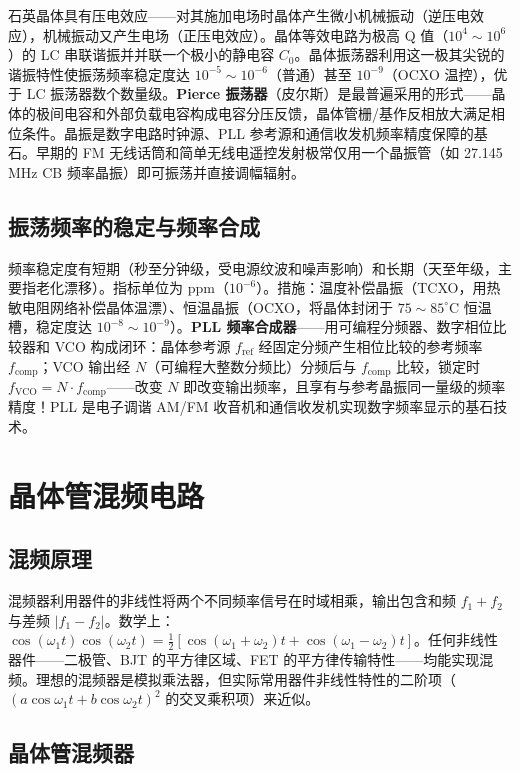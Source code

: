 \documentclass[12pt,UTF8]{ctexbook}
\begin{document}
石英晶体具有压电效应——对其施加电场时晶体产生微小机械振动（逆压电效应），机械振动又产生电场（正压电效应）。晶体等效电路为极高 Q 值（$10^4\sim10^6$）的 LC 串联谐振并并联一个极小的静电容 $C_0$。晶体振荡器利用这一极其尖锐的谐振特性使振荡频率稳定度达 $10^{-5}\sim10^{-6}$（普通）甚至 $10^{-9}$（OCXO 温控），优于 LC 振荡器数个数量级。\textbf{Pierce 振荡器}（皮尔斯）是最普遍采用的形式——晶体的极间电容和外部负载电容构成电容分压反馈，晶体管栅/基作反相放大满足相位条件。晶振是数字电路时钟源、PLL 参考源和通信收发机频率精度保障的基石。早期的 FM 无线话筒和简单无线电遥控发射极常仅用一个晶振管（如 27.145 MHz CB 频率晶振）即可振荡并直接调幅辐射。

\subsection{振荡频率的稳定与频率合成}

频率稳定度有短期（秒至分钟级，受电源纹波和噪声影响）和长期（天至年级，主要指老化漂移）。指标单位为 ppm（$10^{-6}$）。措施：温度补偿晶振（TCXO，用热敏电阻网络补偿晶体温漂）、恒温晶振（OCXO，将晶体封闭于 $75\sim85^\circ\mathrm{C}$ 恒温槽，稳定度达 $10^{-8}\sim10^{-9}$）。\textbf{PLL 频率合成器}——用可编程分频器、数字相位比较器和 VCO 构成闭环：晶体参考源 $f_{\text{ref}}$ 经固定分频产生相位比较的参考频率 $f_{\text{comp}}$；VCO 输出经 $N$（可编程大整数分频比）分频后与 $f_{\text{comp}}$ 比较，锁定时 $f_{\text{VCO}} = N \cdot f_{\text{comp}}$——改变 $N$ 即改变输出频率，且享有与参考晶振同一量级的频率精度！PLL 是电子调谐 AM/FM 收音机和通信收发机实现数字频率显示的基石技术。

\section{晶体管混频电路}
\label{sec:transistor_mixer}

\subsection{混频原理}

混频器利用器件的非线性将两个不同频率信号在时域相乘，输出包含和频 $f_1+f_2$ 与差频 $|f_1-f_2|$。数学上：$\cos(\omega_1 t)\cos(\omega_2 t) = \frac{1}{2}[\cos(\omega_1+\omega_2)t + \cos(\omega_1-\omega_2)t]$。任何非线性器件——二极管、BJT 的平方律区域、FET 的平方律传输特性——均能实现混频。理想的混频器是模拟乘法器，但实际常用器件非线性特性的二阶项（$(a\cos\omega_1t+b\cos\omega_2t)^2$ 的交叉乘积项）来近似。

\subsection{晶体管混频器}
\end{document}
